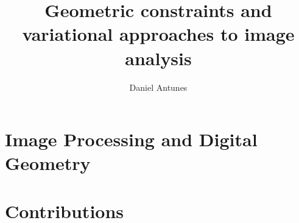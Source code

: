 \documentclass[a4paper,12pt]{book}
\begin{document}
	\title{Geometric constraints and variational approaches to image analysis}
	\author{Daniel Antunes}
	\date{}
	\maketitle
	
%		
%	
	
	\tableofcontents	
%	
	
	
	\part{Image Processing and Digital Geometry}
	
	
	
	
	\part{Contributions}	
	
	
		
	
	
		
	\begin{appendices}
					
		
%						
%				
%					
%				
	\end{appendices}
	
	

%
\printbibliography
	
\end{document}
